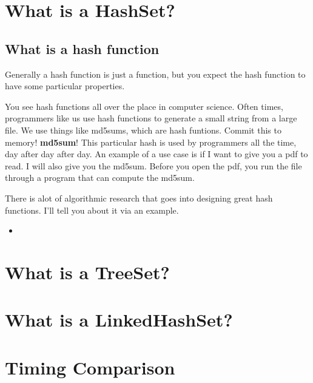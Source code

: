 \documentclass[12pt]{article}
\begin{document}
\section{What is a HashSet?}

\subsection{What is a hash function}
Generally a hash function is just a function, but you expect the hash function to have some particular properties. 

You see hash functions all over the place in computer science. Often times, programmers like us use hash functions to generate a small string from a large file. We use things like md5sums, which are hash funtions. Commit this to memory! \textbf{md5sum}! This particular hash is used by programmers all the time, day after day after day. An example of a use case is if I want to give you a pdf to read. I will also give you the md5sum. Before you open the pdf, you run the file through a program that can compute the md5sum.



There is alot of algorithmic research that goes into designing great hash functions. I'll tell you about it via an example. 

\begin{itemize}
\item
\end{itemize}

\section{What is a TreeSet?}

\section{What is a LinkedHashSet?}

\section{Timing Comparison}
\end{document}
